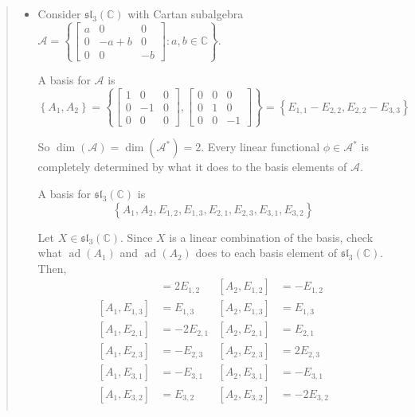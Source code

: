 \documentclass[letterpaper, 10pt]{article}
\theoremstyle{theostyle}
\begin{document}
\begin{quote}
\begin{itemize}
        \item Consider \(\mathfrak{sl}_3 (\mathbb{C})\) with Cartan subalgebra
        \(\mathcal{A} = \left\{\begin{bmatrix}
        a & 0 & 0 \\
        0 & -a + b & 0 \\
        0 & 0 & -b
        \end{bmatrix} : a, b \in \mathbb{C} \right\}\).

        A basis for \(\mathcal{A}\) is 
        \[\left\{A_1, A_2\right\} = \left\{ \begin{bmatrix}
            1 & 0 & 0 \\
            0 & -1 & 0 \\
            0 & 0 & 0
        \end{bmatrix},
        \begin{bmatrix}
            0 & 0 & 0 \\
            0 & 1 & 0 \\
            0 & 0 & -1
        \end{bmatrix}\right\}
        = \left\{E_{1, 1} - E_{2, 2}, E_{2, 2} - E_{3, 3} \right\}\]

        So \(\dim{(\mathcal{A})} = \dim(\mathcal{A}^\ast) = 2\).
        Every linear functional \(\phi \in \mathcal{A}^\ast\) is completely determined by what it does to the basis elements of \(\mathcal{A}\).

        A basis for \(\mathfrak{sl}_3(\mathbb{C})\) is 
        \[\left\{A_1, A_2, E_{1, 2}, E_{1, 3}, E_{2, 1}, E_{2, 3}, E_{3, 1}, E_{3, 2}\right\}\]
        
        Let \(X \in \mathfrak{sl}_3 (\mathbb{C})\).
        Since \(X\) is a linear combination of the basis, check what \(\operatorname{ad}(A_1)\) and \(\operatorname{ad}(A_2)\) does to each basis element of \(\mathfrak{sl}_3 (\mathbb{C})\).
        Then,
        \begin{align*}
            [A_1, E_{1, 2}] &=  2E_{1, 2} & [A_2, E_{1, 2}] &=  -E_{1, 2}\\
            [A_1, E_{1, 3}] &=   E_{1, 3} & [A_2, E_{1, 3}] &=   E_{1, 3}\\
            [A_1, E_{2, 1}] &= -2E_{2, 1} & [A_2, E_{2, 1}] &=   E_{2, 1}\\
            [A_1, E_{2, 3}] &=  -E_{2, 3} & [A_2, E_{2, 3}] &=  2E_{2, 3}\\
            [A_1, E_{3, 1}] &=  -E_{3, 1} & [A_2, E_{3, 1}] &=  -E_{3, 1}\\
            [A_1, E_{3, 2}] &=   E_{3, 2} & [A_2, E_{3, 2}] &= -2E_{3, 2}\\
        \end{align*}


\end{itemize}
\end{quote}
\end{document}

